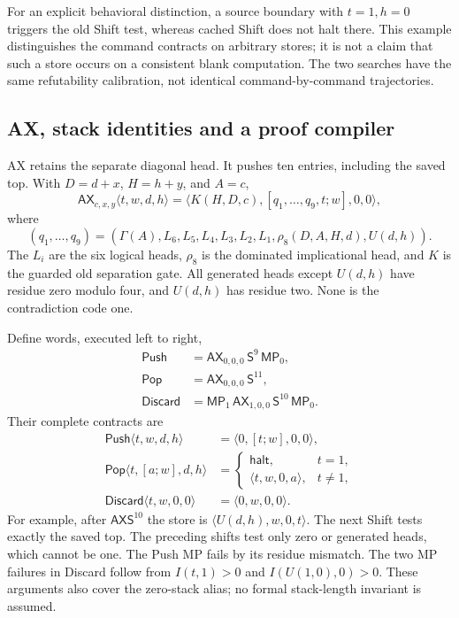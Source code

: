 \documentclass[11pt,letterpaper]{article}
\newcommand{\AX}{\mathsf{AX}}\newcommand{\MP}{\mathsf{MP}}\newcommand{\Shift}{\mathsf S}
\begin{document}
For an explicit behavioral distinction, a source boundary with $t=1,h=0$
triggers the old Shift test, whereas cached Shift does not halt there.
This example distinguishes the command contracts on arbitrary stores; it is
not a claim that such a store occurs on a consistent blank computation.
The two searches have the same refutability calibration, not identical
command-by-command trajectories.

\subsection{AX, stack identities and a proof compiler}

AX retains the separate diagonal head. It pushes ten entries, including the
saved top. With $D=d+x$, $H=h+y$, and $A=c$,
\[
 \AX_{c,x,y}\langle t,w,d,h\rangle
 =\langle K(H,D,c),[q_1,\ldots,q_9,t;w],0,0\rangle,
\]
where
\[
(q_1,\ldots,q_9)=(\Gamma(A),L_6,L_5,L_4,L_3,L_2,L_1,
                   \rho_8(D,A,H,d),U(d,h)).
\]
The $L_i$ are the six logical heads, $\rho_8$ is the dominated implicational
head, and $K$ is the guarded old separation gate. All generated heads except
$U(d,h)$ have residue zero modulo four, and $U(d,h)$ has residue two.
None is the contradiction code one.

Define words, executed left to right,
\[
\begin{aligned}
 \mathsf{Push}&=\AX_{0,0,0}\,\Shift^9\,\MP_0,\\
 \mathsf{Pop}&=\AX_{0,0,0}\,\Shift^{11},\\
 \mathsf{Discard}&=\MP_1\,\AX_{1,0,0}\,\Shift^{10}\,\MP_0.
\end{aligned}
\]
Their complete contracts are
\[
\begin{aligned}
 \mathsf{Push}\langle t,w,d,h\rangle&=\langle0,[t;w],0,0\rangle,\\
 \mathsf{Pop}\langle t,[a;w],d,h\rangle&=
 \begin{cases}\mathsf{halt},&t=1,\\\langle t,w,0,a\rangle,&t\ne1,\end{cases}\\
 \mathsf{Discard}\langle t,w,0,0\rangle&=\langle0,w,0,0\rangle.
\end{aligned}
\]
For example, after $\AX\Shift^{10}$ the store is
$\langle U(d,h),w,0,t\rangle$. The next Shift tests exactly the saved top.
The preceding shifts test only zero or generated heads, which cannot be one.
The Push MP fails by its residue mismatch. The two MP failures in Discard
follow from $I(t,1)>0$ and $I(U(1,0),0)>0$. These arguments also cover the
zero-stack alias; no formal stack-length invariant is assumed.
\end{document}
